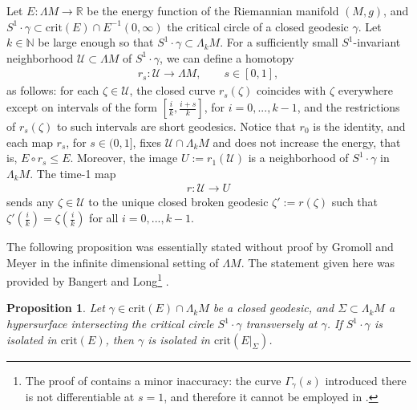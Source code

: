 \documentclass[reqno]{amsart}
\numberwithin{equation}{section}
\theoremstyle{personal}%
\newtheorem{prop}[thm]{Proposition}
\theoremstyle{definition}
\newcommand{\N}{\mathds{N}}
\newcommand{\R}{\mathds{R}}
\newcommand{\crit}{\mathrm{crit}}
\begin{document}
Let $E:\Lambda M\to\R$ be the energy function of the Riemannian manifold $(M,g)$, and $S^1\cdot\gamma\subset\crit(E)\cap E^{-1}(0,\infty)$ the critical circle of a closed geodesic $\gamma$. Let $k\in\N$ be large enough so that $S^1\cdot\gamma\subset\Lambda_kM$. For a sufficiently small $S^1$-invariant neighborhood $\mathcal U\subset\Lambda M$ of $S^1\cdot\gamma$, we can define a homotopy
\begin{align}\label{e:def_retraction}
r_s:\mathcal U\to\Lambda M,\qquad s\in[0,1],
\end{align}
as follows: for each $\zeta\in\mathcal U$, the closed curve $r_s(\zeta)$ coincides with $\zeta$ everywhere except on intervals of the form $[\tfrac{i}{k},\tfrac{i+s}{k}]$, for $i=0,...,k-1$, and the restrictions of  $r_s(\zeta)$ to such intervals are short geodesics. Notice that $r_0$ is the identity, and each map $r_s$, for $s\in(0,1]$, fixes $\mathcal U\cap\Lambda_kM$ and does not increase the energy, that is, $E\circ r_s\leq E$. Moreover, the image $U:=r_1(\mathcal U)$ is a  neighborhood of $S^1\cdot\gamma$ in $\Lambda_kM$. The time-1 map 
\begin{align}\label{e:retraction}
r:\mathcal U\to U
\end{align}
sends any $\zeta\in\mathcal{U}$ to the unique closed broken geodesic $\zeta':=r(\zeta)$ such that $\zeta'(\tfrac ik)=\zeta(\tfrac ik)$ for all $i=0,...,k-1$.




The following proposition was essentially stated without proof by Gromoll and Meyer \cite[Page~501]{Gromoll:1969gh} in the infinite dimensional setting of $\Lambda M$. The statement given here was provided by Bangert and Long\footnote{The proof of \cite[Lemma~3.5]{Bangert:2010ak} contains a minor inaccuracy: the curve $\Gamma_\gamma(s)$ introduced there is not differentiable at $s=1$, and therefore it cannot be employed in \cite[Equation~(3.14)]{Bangert:2010ak}.} \cite[Lemma~3.5]{Bangert:2010ak}.

\begin{prop}\label{p:isolated}
Let $\gamma\in\crit(E)\cap\Lambda_kM$ be a closed geodesic, and $\Sigma\subset\Lambda_kM$ a hypersurface intersecting the critical circle $S^1\cdot\gamma$ transversely at $\gamma$. If  $S^1\cdot\gamma$ is isolated in $\crit(E)$, then $\gamma$ is isolated in $\crit(E|_{\Sigma})$.
\end{prop}
\end{document}
